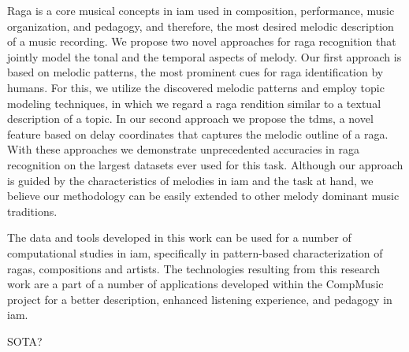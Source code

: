 Raga is a core musical concepts in \gls{iam} used in composition, performance, music organization, and pedagogy, and therefore, the most desired melodic description of a music recording. We propose two novel approaches for raga recognition that jointly model the tonal and the temporal aspects of melody. Our first approach is based on melodic patterns, the most prominent cues for raga identification by humans. For this, we utilize the discovered melodic patterns and employ topic modeling techniques, in which we regard a \gls{raga} rendition similar to a textual description of a topic. In our second approach we propose the \gls{tdms}, a novel feature based on delay coordinates that captures the melodic outline of a \gls{raga}. With these approaches we demonstrate unprecedented accuracies in \gls{raga} recognition on the largest datasets ever used for this task.  Although our approach is guided by the characteristics of melodies in \gls{iam} and the task at hand, we believe our methodology can be easily extended to other melody dominant music traditions.
	
The data and tools developed in this work can be used for a number of computational studies in \gls{iam}, specifically in pattern-based characterization of ragas, compositions and artists. The technologies resulting from this research work are a part of a number of applications developed within the CompMusic project for a better description, enhanced listening experience, and pedagogy in \gls{iam}.  


SOTA?

